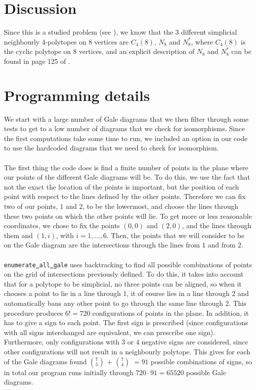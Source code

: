 \documentclass[paper=a4, fontsize=11pt]{scrartcl} %
\theoremstyle{definition}
\begin{document}
\section{Discussion}
Since this is a studied problem (see \cite{GrSr67}), we know that the 3 different simplicial neighbourly 4-polytopes on 8 vertices are $C_4(8)$, $N_8$ and $N_8^*$, where $C_4(8)$ is the cyclic polytope on 8 vertices, and an explicit description of $N_8$ and $N_8^*$ can be found in page 125 of \cite{Gr03}.


\section{Programming details}
We start with a large number of Gale diagrams that we then filter through some tests to get to a low number of diagrams that we check for isomorphisms. Since the first computations take some time to run, we included an option in our code to use the hardcoded diagrams that we need to check for isomorphism.\\
\\
The first thing the code does is find a finite number of points in the plane where our points of the different Gale diagrams will be. To do this, we use the fact that not the exact the location of the points is important, but the position of each point with respect to the lines defined by the other points. Therefore we can fix two of our points, $1$ and $2$, to be the lowermost, and choose the lines through these two points on which the other points will lie. To get more or less reasonable coordinates, we chose to fix the points $(0,0)$ and $(2,0)$, and the lines through them and $(1,i)$, with $i =1,\ldots,6$. Then, the points that we will consider to be on the Gale diagram are the intersections through the lines from $1$ and from $2$.\\
\\
\texttt{enumerate\underline{ }all\underline{ }gale} uses backtracking to find all possible combinations of  points on the grid of intersections previously defined. To do this, it takes into account that for a polytope to be simplicial, no three points can be aligned, so when it chooses a point to lie in a line through 1, it of course lies in a line through 2 and automatically bans any other point to go through the same line through 2. This procedure produces $6! = 720$ configurations of points in the plane. In addition, it has to give a sign to each point. The first sign is prescribed (since configurations with all signs interchanged are equivalent, we can prescribe one sign). Furthermore, only configurations with $3$ or $4$ negative signs are considered, since other configurations will not result in a neighbourly polytope. This gives for each of the Gale diagrams found $7\choose 5$ $+$ $7\choose 4$ $= 91$ possible combinations of signs, so in total our program runs initially through $720\cdot 91 = 65520$ possible Gale diagrams.\\
\end{document}
